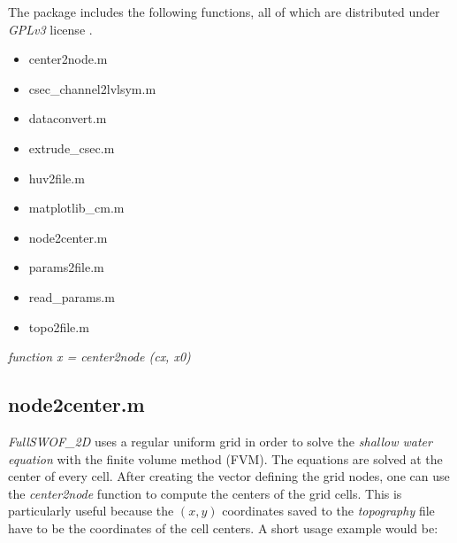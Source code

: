 The package includes the following functions, all of which are distributed under \textit {GPLv3} license \autocite{smith_quick_2014}.

\begin{itemize}
\itemsep0em
  \item center2node.m
  \item csec\_channel2lvlsym.m
  \item dataconvert.m
  \item extrude\_csec.m
  \item huv2file.m
  \item matplotlib\_cm.m
  \item node2center.m
  \item params2file.m
  \item read\_params.m
  \item topo2file.m
\end{itemize}

\textit{function x = center2node (cx, x0)}\\


\subsection*{node2center.m}

\textit{FullSWOF\_2D} uses a regular uniform grid in order to solve the \emph{shallow water equation} with the finite volume method (FVM).
The equations are solved at the center of every cell.
After creating the vector defining the grid nodes, one can use the \textit{center2node} function to compute the centers of the grid cells.
This is particularly useful because the $(x,y)$ coordinates saved to the \textit{topography} file have to be the coordinates of the cell centers.
A short usage example would be:




